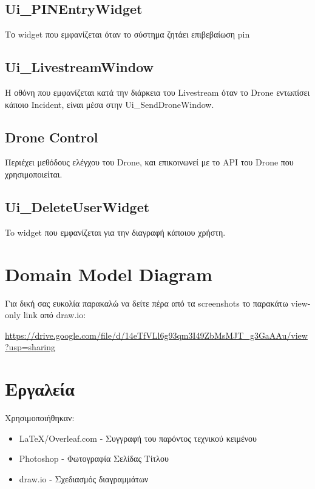 \documentclass{article}
\begin{document}
\subsection{Ui\_PINEntryWidget}
Το widget που εμφανίζεται όταν το σύστημα ζητάει επιβεβαίωση pin

\subsection{Ui\_LivestreamWindow}
Η οθόνη που εμφανίζεται κατά την διάρκεια του Livestream όταν το Drone εντωπίσει κάποιο Incident, είναι μέσα στην Ui\_SendDroneWindow.

\subsection{Drone Control}
Περιέχει μεθόδους ελέγχου του Drone, και επικοινωνεί με το API του Drone που χρησιμοποιείται.

\subsection{Ui\_DeleteUserWidget}
To widget που εμφανίζεται για την διαγραφή κάποιου χρήστη.  



\section{Domain Model Diagram}
Για δική σας ευκολία παρακαλώ να δείτε πέρα από τα screenshots το παρακάτω view-only link από draw.io:

\url{https://drive.google.com/file/d/14eTfVLl6g93qm3I49ZbMsMJT_g3GaAAu/view?usp=sharing}

\newpage
\noindent{}\newpage

\newpage

\section{Εργαλεία}
Χρησιμοποιήθηκαν:
\begin{itemize}
    \item \LaTeX/Overleaf.com - Συγγραφή του παρόντος τεχνικού κειμένου
    \item Photoshop - Φωτογραφία Σελίδας Τίτλου
    \item draw.io - Σχεδιασμός διαγραμμάτων
\end{itemize}
\end{document}

